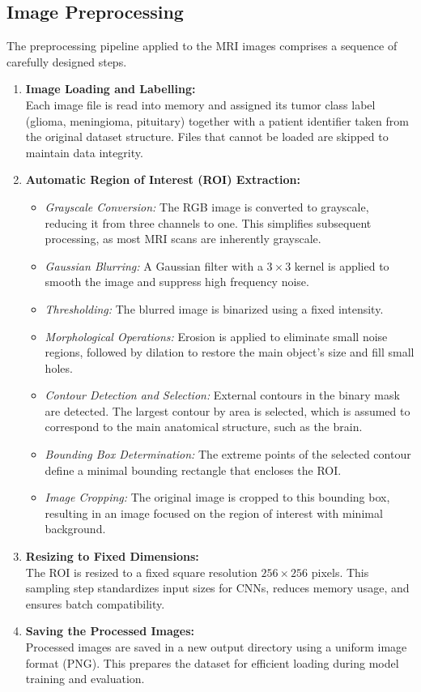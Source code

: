 \subsection{Image Preprocessing}
The preprocessing pipeline applied to the MRI images comprises a sequence of carefully designed steps.
\begin{enumerate}
    \item \textbf{Image Loading and Labelling:} \\
    Each image file is read into memory and assigned its tumor class label (glioma, meningioma, pituitary) together with a patient identifier taken from the original dataset structure. Files that cannot be loaded are skipped to maintain data integrity.

    \item \textbf{Automatic Region of Interest (ROI) Extraction:}
    \begin{itemize}
        \item \textit{Grayscale Conversion:} The RGB image is converted to grayscale, reducing it from three channels to one. This simplifies subsequent processing, as most MRI scans are inherently grayscale.
        \item \textit{Gaussian Blurring:} A Gaussian filter with a $3 \times 3$ kernel is applied to smooth the image and suppress high frequency noise.
        \item \textit{Thresholding:} The blurred image is binarized using a fixed intensity.
        \item \textit{Morphological Operations:} Erosion is applied to eliminate small noise regions, followed by dilation to restore the main object's size and fill small holes.
        \item \textit{Contour Detection and Selection:} External contours in the binary mask are detected. The largest contour by area is selected, which is assumed to correspond to the main anatomical structure, such as the brain.
        \item \textit{Bounding Box Determination:} The extreme points of the selected contour define a minimal bounding rectangle that encloses the ROI.
        \item \textit{Image Cropping:} The original image is cropped to this bounding box, resulting in an image focused on the region of interest with minimal background.
    \end{itemize}

    \item \textbf{Resizing to Fixed Dimensions:} \\
    The ROI is resized to a fixed square resolution $256 \times 256$ pixels. This sampling step standardizes input sizes for CNNs, reduces memory usage, and ensures batch compatibility.

    \item \textbf{Saving the Processed Images:} \\
    Processed images are saved in a new output directory using a uniform image format (PNG). This prepares the dataset for efficient loading during model training and evaluation.

\end{enumerate}


